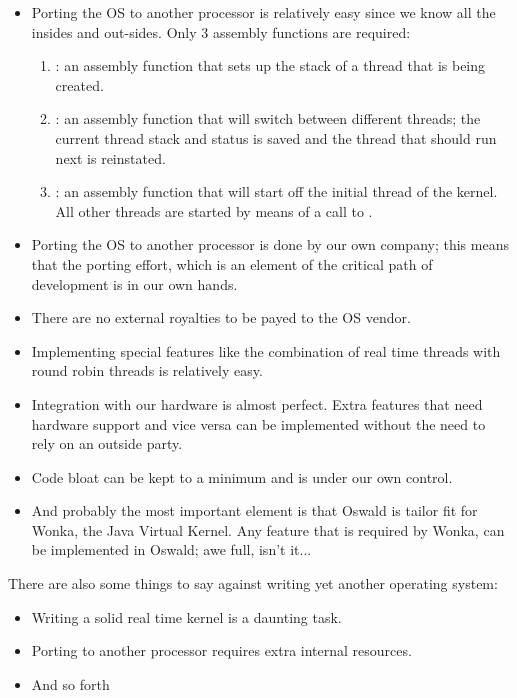 \begin{itemize}
\item Porting the OS to another processor is relatively easy since we know
all the insides and out-sides. Only 3 assembly functions are required:
\begin{enumerate}
\item {}: an assembly function that sets up the stack of
a thread that is being created.
\item {}: an assembly function that will switch
between different threads; the current thread stack and status is saved and the thread
that should run next is reinstated.
\item {}: an assembly function that will start off the
initial thread of the kernel. All other threads are started by means of a
call to .
\end{enumerate}

\item Porting the OS to another processor is done by our own company; this
means that the porting effort, which is an element of the critical path of
development is in our own hands.
\item There are no external royalties to be payed to the OS vendor.
\item Implementing special features like the combination of real time
threads with round robin threads is relatively easy.
\item Integration with our hardware is almost perfect. Extra features that
need hardware support and vice versa can be implemented without the need to
rely on an outside party.
\item Code bloat can be kept to a minimum and is under our own control.
\item And probably the most important element is that Oswald is tailor fit for
Wonka, the Java Virtual Kernel. Any feature that is required by Wonka, can
be implemented in Oswald; awe full, isn't it...
\end{itemize}

There are also some things to say against writing yet another operating
system:

\begin{itemize}
\item Writing a solid real time kernel is a daunting task.
\item Porting to another processor requires extra internal resources.
\item And so forth
\end{itemize}
